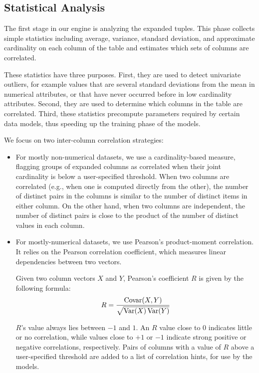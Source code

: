 \subsection{Statistical Analysis}
\label{sec:statistical-analysis}

The first stage in our engine is analyzing the expanded tuples.
This phase collects simple statistics including average, variance, standard deviation, and approximate cardinality on each column of the table and estimates which sets of columns are correlated.

These statistics have three purposes. 
First, they are used to detect univariate outliers, for example values that are several standard deviations from the mean in numerical attributes, or that have never occurred before in low cardinality attributes.
Second, they are used to determine which columns in the table are correlated. 
Third, these statistics precompute parameters required by certain data models, thus speeding up the training phase of the models.

We focus on two inter-column correlation strategies:

\begin{itemize}
\item For mostly non-numerical datasets, we use a cardinality-based measure, flagging groups of expanded columns as correlated when their joint cardinality is below a user-specified threshold. When two columns are correlated (e.g., when one is computed directly from the other), the number of distinct pairs in the columns is similar to the number of distinct items in either column. On the other hand, when two columns are independent, the number of distinct pairs is close to the product of the number of distinct values in each column.
\item For mostly-numerical datasets, we use Pearson's product-moment
  correlation. It relies on the Pearson correlation coefficient,
  which measures linear dependencies between two vectors.

  Given two column vectors $X$ and $Y$, Pearson's coefficient $R$ is given by the following formula:
  \begin{align}
    \label{eqn:pearson}
    R = \frac{\Covar(X,Y)}{\sqrt{\Var(X)\Var(Y)}}
  \end{align}

  $R$'s value always lies between $-1$ and $1$. An $R$ value close to 0 indicates little or no correlation, while values close to $+1$ or $-1$ indicate strong positive or negative correlations, respectively. Pairs of columns with a value of \(R\) above a user-specified threshold are added to a list of correlation hints, for use by the models.
\end{itemize}

